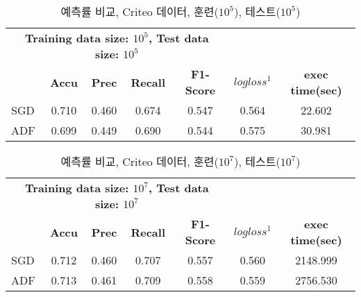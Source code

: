 \documentclass[oneside,b5paper,11pt]{book}
\theoremstyle{plain}
\theoremstyle{definition}
\theoremstyle{remark}
\theoremstyle{definition}
\numberwithin{equation}{chapter}
\begin{document}
\begin{table}
{\footnotesize
	\begin{center}%
	\begin{tabular}{ccccccc}
	\hline\hline %

    \multicolumn{5}{c}{\textbf{Training data size: $10^5$, Test data size: $10^5$}} & \textbf{} & \textbf{} \\

	\textbf{} & \textbf{Accu} & \textbf{Prec} & \textbf{Recall} & \textbf{F1-Score} & \textbf{$logloss^1$} & \textbf{exec time(sec)} \\

	\hline %
	
	\multicolumn {1}{l|}{SGD} & 0.710 & 0.460 & 0.674 & 0.547 & 0.564 & 22.602 \\ \hline
	\multicolumn {1}{l|}{ADF} & 0.699 & 0.449 & 0.690 & 0.544 & 0.575 & 30.981 \\ \hline

	\hline %
	\end{tabular}
    \end{center}
    \caption[예측률 비교, Criteo 데이터($10^5$)]{예측률 비교, Criteo 데이터, 훈련($10^5$), 테스트($10^5$)}
}
\end{table}



\begin{table}
{\footnotesize
	\begin{center}%
	\begin{tabular}{ccccccc}
	\hline\hline %

    \multicolumn{5}{c}{\textbf{Training data size: $10^7$, Test data size: $10^7$}} & \textbf{} & \textbf{} \\

	\textbf{} & \textbf{Accu} & \textbf{Prec} & \textbf{Recall} & \textbf{F1-Score} & \textbf{$logloss^1$} & \textbf{exec time(sec)} \\

	\hline %
	
	\multicolumn {1}{l|}{SGD} & 0.712 & 0.460 & 0.707 & 0.557 & 0.560 & 2148.999 \\ \hline
	\multicolumn {1}{l|}{ADF} & 0.713 & 0.461 & 0.709 & 0.558 & 0.559 & 2756.530 \\ \hline

	\hline %
	\end{tabular}
    \end{center}
    \caption[예측률 비교, Criteo 데이터($10^7$)]{예측률 비교, Criteo 데이터, 훈련($10^7$), 테스트($10^7$)}
}
\end{table}
\end{document}
